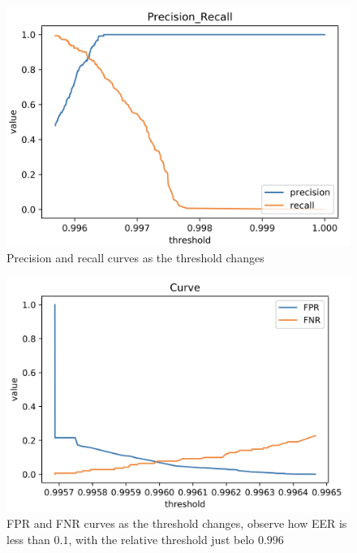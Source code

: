\documentclass[8pt,notitlepage]{report}
\begin{document}
			\begin{figure}[H]
				\begin{center}
					\includegraphics[scale=.45]{precision_recall_DTW_Antonio}
					\caption{Precision and recall curves as the threshold changes}
				\end{center}
			\end{figure}
			
			\begin{figure}[H]
				\begin{center}
					\includegraphics[scale=.45]{fpr_fnr_DTW_Antonio}
					\caption{FPR and FNR curves as the threshold changes, observe how EER is less than $ 0.1 $, with the relative threshold just belo $ 0.996 $}
				\end{center}
			\end{figure}
		
\end{document}
